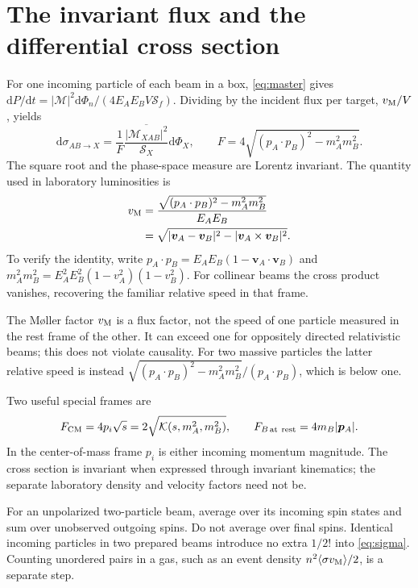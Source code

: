 \documentclass[11pt]{article}
\newcommand{\dd}{\mathrm d}
\newcommand{\module}[1]{\clearpage\section{#1}}
\newcommand{\cM}{\mathcal M}
\newcommand{\cS}{\mathcal S}
\newcommand{\Kallen}{\mathcal K}
\begin{document}
\module{The invariant flux and the differential cross section}
For one incoming particle of each beam in a box, \eqref{eq:master} gives
\(\dd P/\dd t=|\cM|^2\dd\Phi_n/(4E_AE_BV\cS_f)\).
Dividing by the incident flux per target, \(v_{\rm M}/V\), yields
\begin{equation}
 \boxed{\quad \dd\sigma_{AB\to X}=
 \frac{1}{F}\frac{\overline{|\cM_{XA B}|^2}}{\cS_X}\dd\Phi_X,
 \qquad F=4\sqrt{(p_A\cdot p_B)^2-m_A^2m_B^2}.\quad}
 \label{eq:sigma}
\end{equation}
The square root and the phase-space measure are Lorentz invariant.
The quantity used in laboratory luminosities is
\begin{align}
 v_{\rm M}&=\frac{\sqrt{(p_A\cdot p_B)^2-m_A^2m_B^2}}{E_AE_B}\notag\\
 &=\sqrt{|\bm v_A-\bm v_B|^2-|\bm v_A\times\bm v_B|^2}.
 \label{eq:moller}
\end{align}
To verify the identity, write
\(p_A\cdot p_B=E_AE_B(1-\bm v_A\cdot\bm v_B)\) and
\(m_A^2m_B^2=E_A^2E_B^2(1-v_A^2)(1-v_B^2)\).
For collinear beams the cross product vanishes, recovering the familiar
relative speed in that frame.

The M\o ller factor \(v_{\rm M}\) is a flux factor, not the speed of one
particle measured in the rest frame of the other. It can exceed one for
oppositely directed relativistic beams; this does not violate causality.
For two massive particles the latter relative speed is instead
\(\sqrt{(p_A\cdot p_B)^2-m_A^2m_B^2}/(p_A\cdot p_B)\), which is below one.

Two useful special frames are
\begin{equation}
 F_{\rm CM}=4p_i\sqrt{s}=2\sqrt{\Kallen(s,m_A^2,m_B^2)},\qquad
 F_{B\,\mathrm{at\ rest}}=4m_B|\bm p_A|.
\end{equation}
In the center-of-mass frame \(p_i\) is either incoming momentum magnitude.
The cross section is invariant when expressed through invariant kinematics;
the separate laboratory density and velocity factors need not be.

\begin{keyidea}
For an unpolarized two-particle beam, average over its incoming spin states
and sum over unobserved outgoing spins. Do not average over final spins.
Identical incoming particles in two prepared beams introduce no extra
\(1/2!\) into \eqref{eq:sigma}. Counting unordered pairs in a gas, such as
an event density \(n^2\langle\sigma v_{\rm M}\rangle/2\), is a separate step.
\end{keyidea}
\end{document}
